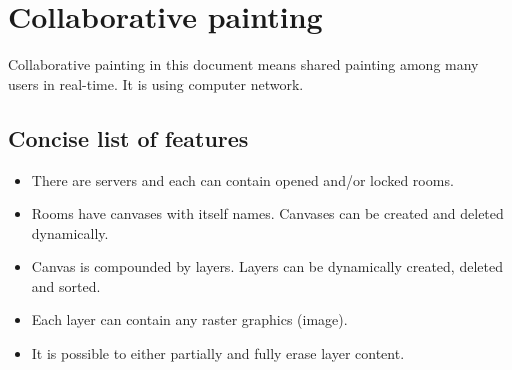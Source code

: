 \chapter{Collaborative painting}
\label{collaborative_painting}

Collaborative painting in this document means shared painting among many users in real-time. It is using computer network.

\section{Concise list of features}

\begin{itemize}
	\item There are servers and each can contain opened and/or locked rooms.
	\item Rooms have canvases with itself names. Canvases can be created and deleted dynamically.
	\item Canvas is compounded by layers. Layers can be dynamically created, deleted and sorted.
	\item Each layer can contain any raster graphics (image).
	\item It is possible to either partially and fully erase layer content. 
\end{itemize}
